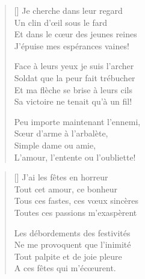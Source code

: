 \settowidth{\versewidth}{L'amour, l'entente ou l'oubliette.}
\begin{verse}[\versewidth]
Je cherche dans leur regard \\
Un clin d'œil sous le fard \\
Et dans le cœur des jeunes reines \\
J'épuise mes espérances vaines!

Face à leurs yeux je suis l'archer \\
Soldat que la peur fait trébucher \\
Et ma flèche se brise à leurs cils \\
Sa victoire ne tenait qu'à un fil!

Peu importe maintenant l'ennemi, \\
Sœur d'arme à l'arbalète, \\
Simple dame ou amie, \\
L'amour, l'entente ou l'oubliette!
\end{verse}


\settowidth{\versewidth}{Tous ces fastes, ces vœux sincères}
\begin{verse}[\versewidth]
J'ai les fêtes en horreur \\
Tout cet amour, ce bonheur \\
Tous ces fastes, ces vœux sincères \\
Toutes ces passions m'exaspèrent

Les débordements des festivités \\
Ne me provoquent que l'inimité \\
Tout palpite et de joie pleure \\
A ces fêtes qui m'écœurent.
\end{verse}

\newpage

